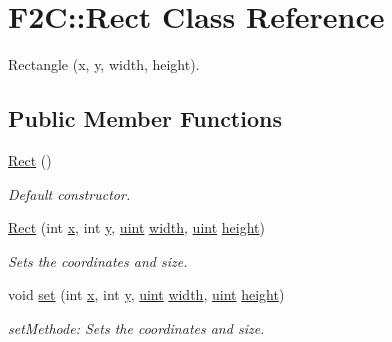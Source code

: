\hypertarget{class_f2_c_1_1_rect}{
\section{F2C::Rect Class Reference}
\label{class_f2_c_1_1_rect}
}


Rectangle (x, y, width, height).  


\subsection*{Public Member Functions}
\begin{DoxyCompactItemize}
\item 
\hypertarget{class_f2_c_1_1_rect_af570dfeafc6bdbf8bf71de8b013ec900}{
\hyperlink{class_f2_c_1_1_rect_af570dfeafc6bdbf8bf71de8b013ec900}{Rect} ()}
\label{class_f2_c_1_1_rect_af570dfeafc6bdbf8bf71de8b013ec900}

\begin{DoxyCompactList}\small\item\em Default constructor. \item\end{DoxyCompactList}\item 
\hyperlink{class_f2_c_1_1_rect_a8bcb9a48495ea4d148adcef272e67822}{Rect} (int \hyperlink{class_f2_c_1_1_rect_ac7bcfcc62fd039c017237fe58af2c522}{x}, int \hyperlink{class_f2_c_1_1_rect_a6544ff924f6cbac45818f791c211f263}{y}, \hyperlink{namespace_f2_c_a58be2bac9eb3e3c99cb41b6008bf4fae}{uint} \hyperlink{class_f2_c_1_1_rect_af3b89af9b207a83a41b1d627ebf05b6e}{width}, \hyperlink{namespace_f2_c_a58be2bac9eb3e3c99cb41b6008bf4fae}{uint} \hyperlink{class_f2_c_1_1_rect_a8b7a0f3c1156c169ca5f47b0bc739197}{height})
\begin{DoxyCompactList}\small\item\em Sets the coordinates and size. \item\end{DoxyCompactList}\item 
void \hyperlink{class_f2_c_1_1_rect_ad7bf1745dbafc37295e53cd0f72e12f2}{set} (int \hyperlink{class_f2_c_1_1_rect_ac7bcfcc62fd039c017237fe58af2c522}{x}, int \hyperlink{class_f2_c_1_1_rect_a6544ff924f6cbac45818f791c211f263}{y}, \hyperlink{namespace_f2_c_a58be2bac9eb3e3c99cb41b6008bf4fae}{uint} \hyperlink{class_f2_c_1_1_rect_af3b89af9b207a83a41b1d627ebf05b6e}{width}, \hyperlink{namespace_f2_c_a58be2bac9eb3e3c99cb41b6008bf4fae}{uint} \hyperlink{class_f2_c_1_1_rect_a8b7a0f3c1156c169ca5f47b0bc739197}{height})
\begin{DoxyCompactList}\small\item\em setMethode: Sets the coordinates and size. \item\end{DoxyCompactList}\end{DoxyCompactItemize}
